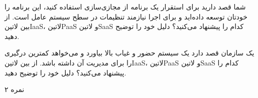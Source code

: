 \documentclass[../main.tex]{subfiles}
\begin{document}

شما قصد دارید برای استقرار یک برنامه از مجازی‌سازی استفاده کنید، این برنامه را خودتان توسعه داده‌اید و برای اجرا نیازمند تنظیمات در سطح سیستم عامل است.
از بین ‌لاتین{IaaS}، ‌لاتین{PaaS} و ‌لاتین{SaaS} کدام را پیشنهاد می‌کنید؟ دلیل خود را توضیح دهید.

یک سازمان قصد دارد یک سیستم حضور و غیاب بالا بیاورد و می‌خواهد کمترین درگیری را برای مدیریت آن داشته باشد.
از بین ‌لاتین{IaaS}، ‌لاتین{PaaS} و ‌لاتین{SaaS} کدام را پیشنهاد می‌کنید؟ دلیل خود را توضیح دهید.

۲ نمره
\end{document}
